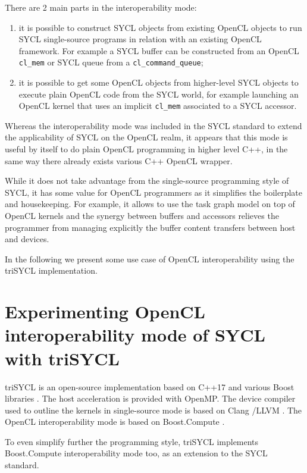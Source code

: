 \documentclass[sigplan, review, authordraft]{acmart}
\begin{document}
There are 2 main parts in the interoperability mode:
\begin{enumerate}
\item it is possible to construct SYCL objects from existing OpenCL
  objects to run SYCL single-source programs in relation with an
  existing OpenCL framework. For example a SYCL buffer can be
  constructed from an OpenCL \lstinline|cl_mem| or SYCL queue from a
  \lstinline|cl_command_queue|;
\item it is possible to get some OpenCL objects from higher-level SYCL
  objects to execute plain OpenCL code from the SYCL world, for
  example launching an OpenCL kernel that uses an implicit
  \lstinline|cl_mem| associated to a SYCL accessor.
\end{enumerate}

Whereas the interoperability mode was included in the SYCL standard to
extend the applicability of SYCL on the OpenCL realm, it appears that
this mode is useful by itself to do plain OpenCL programming in higher
level C++, in the same way there already exists various C++ OpenCL
wrapper.

While it does not take advantage from the single-source programming
style of SYCL, it has some value for OpenCL programmers as it
simplifies the boilerplate and housekeeping. For example, it allows to
use the task graph model on top of OpenCL kernels and the synergy
between buffers and accessors relieves the programmer from managing
explicitly the buffer content transfers between host and devices.

In the following we present some use case of OpenCL interoperability
using the triSYCL implementation.


\section{Experimenting OpenCL interoperability mode of SYCL with
  triSYCL}
\label{sec:exper-with-opencl}

triSYCL \cite{triSYCL} is an open-source implementation based on C++17
and various Boost libraries \cite{Boost-1.63}. The host acceleration
is provided with OpenMP. The device compiler used to outline the
kernels in single-source mode is based on Clang \cite{Clang-4.0}/LLVM
\cite{LLVM-4.0}. The OpenCL interoperability mode is based on
Boost.Compute \cite{Boost.Compute}.

To even simplify further the programming style, triSYCL
implements Boost.Compute interoperability mode too, as an extension to
the SYCL standard.
\end{document}
